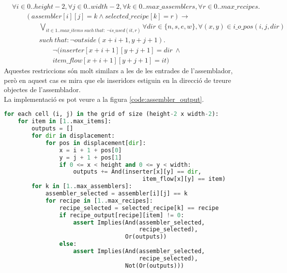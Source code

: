 \begin{align*}
    &\forall i \in 0..height-2, \forall j \in 0..width-2, \forall k \in 0..max\_assemblers, \forall r \in 0..max\_recipes.\\
    &\qquad (assembler[i][j]=k \land selected\_recipe[k]=r)\rightarrow\\
    &\qquad \qquad \bigvee_{it \in 1..max\_items \ such \ that: \ \lnot is\_used(it, r)} \forall dir\in\{n,s,e,w\},\forall (x,y)\in i\_o\_pos(i,j,dir)\\
    &\qquad \qquad such \ that: \lnot outside(x+i+1, y+j+1).\\
    &\qquad \qquad \qquad \lnot (inserter[x+i+1][y+j+1]=dir \ \land \\
    &\qquad \qquad \qquad item\_flow[x+i+1][y+j+1]=it)
\end{align*}
Aquestes restriccions són molt similars a les de les entrades de l'assemblador, però en aquest cas es mira que els inseridors estiguin en la direcció de treure objectes de l'assemblador.\\
La implementació es pot veure a la figura \ref{code:assembler_output}.

\begin{lstlisting}[language=Python, caption=Assembler Output, label=code:assembler_output]
for each cell (i, j) in the grid of size (height-2 x width-2):
    for item in [1..max_items]:
        outputs = []
        for dir in displacement:
            for pos in displacement[dir]:
                x = i + 1 + pos[0]
                y = j + 1 + pos[1]
                if 0 <= x < height and 0 <= y < width:
                    outputs += And(inserter[x][y] == dir,
                                        item_flow[x][y] == item)
        for k in [1..max_assemblers]:
            assembler_selected = assembler[i][j] == k
            for recipe in [1..max_recipes]:
                recipe_selected = selected_recipe[k] == recipe
                if recipe_output[recipe][item] != 0:
                    assert Implies(And(assembler_selected,
                                       recipe_selected),
                                   Or(outputs))
                else:
                    assert Implies(And(assembler_selected,
                                       recipe_selected),
                                   Not(Or(outputs)))
\end{lstlisting}

